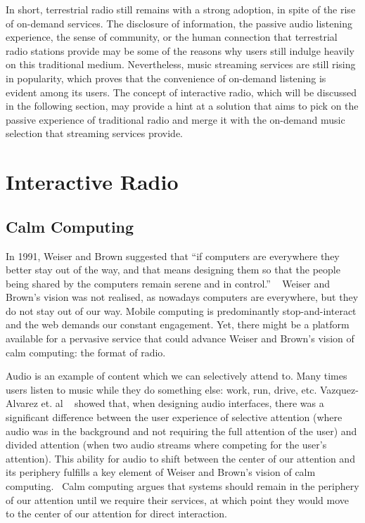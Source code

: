 In short, terrestrial radio still remains with a strong adoption, in spite of the rise of on-demand services. The disclosure of information, the passive audio listening experience, the sense of community, or the human connection that terrestrial radio stations provide may be some of the reasons why users still indulge heavily on this traditional medium. Nevertheless, music streaming services are still rising in popularity, which proves that the convenience of on-demand listening is evident among its users. The concept of interactive radio, which will be discussed in the following section, may provide a hint at a solution that aims to pick on the passive experience of traditional radio and merge it with the on-demand music selection that streaming services provide.

\section{Interactive Radio}

\subsection{Calm Computing}

In 1991, Weiser and Brown suggested that “if computers are everywhere they better stay out of the way, and that means designing them so that the people being shared by the computers remain serene and in control.” ~\cite{Weiser1997} Weiser and Brown’s vision was not realised, as nowadays computers are everywhere, but they do not stay out of our way. Mobile computing is predominantly stop-and-interact and the web demands our constant engagement. Yet, there might be a platform available for a pervasive service that could advance Weiser and Brown’s vision of calm computing: the format of radio.

Audio is an example of content which we can selectively attend to. Many times users listen to music while they do something else: work, run, drive, etc. Vazquez-Alvarez et. al ~\cite{Vazquez-Alvarez2011} showed that, when designing audio interfaces, there was a significant difference between the user experience of selective attention (where audio was in the background and not requiring the full attention of the user) and divided attention (when two audio streams where competing for the user’s attention). This ability for audio to shift between the center of our attention and its periphery fulfills a key element of Weiser and Brown’s vision of calm computing.~\cite{Weiser1997} Calm computing argues that systems should remain in the periphery of our attention until we require their services, at which point they would move to the center of our attention for direct interaction.

